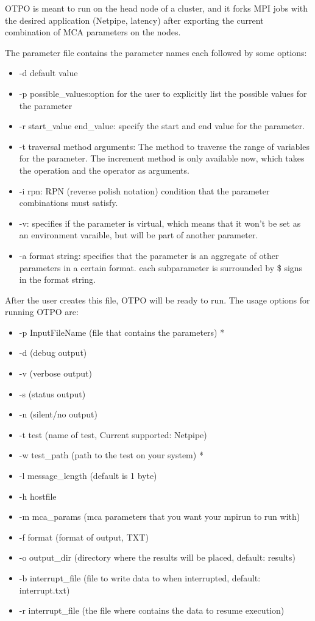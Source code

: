 OTPO is meant to run on the head node of a cluster, and it forks MPI jobs with
the desired application (Netpipe, latency) after exporting the current
combination of MCA parameters on the nodes.

The parameter file contains the parameter names each followed by some options:
\begin{itemize}
\item -d default value
\item -p {possible\_values}:option for the user to explicitly list the possible
  values for the parameter
\item -r start\_value end\_value: specify the start and end value for the
  parameter.
\item -t traversal method arguments: The method to traverse the range of
  variables for the parameter. The increment method is only available now,
  which takes the operation and the operator as arguments.
\item -i rpn: RPN (reverse polish notation) condition that the parameter
  combinations must satisfy.
\item -v: specifies if the parameter is virtual, which means that it won't be
  set as an environment varaible, but will be part of another parameter.
\item -a {format string}: specifies that the parameter is an aggregate of
  other parameters in a certain format. each subparameter is surrounded by \$
  signs in the format string.
\end{itemize}

After the user creates this file, OTPO will be ready to run. The usage options
for running OTPO are:
\begin{itemize}
\item -p InputFileName (file that contains the parameters) *
\item -d (debug output)
\item -v (verbose output)
\item -s (status output)
\item -n (silent/no output)
\item -t test (name of test, Current supported: Netpipe)
\item -w test\_path (path to the test on your system) *
\item -l message\_length (default is 1 byte)
\item -h hostfile
\item -m mca\_params (mca parameters that you want your mpirun to run with)
\item -f format (format of output, TXT)
\item -o output\_dir (directory where the results will be placed, default: results)
\item -b interrupt\_file (file to write data to when interrupted, default:
  interrupt.txt)
\item -r interrupt\_file (the file where contains the data to resume execution) 
\end{itemize}

